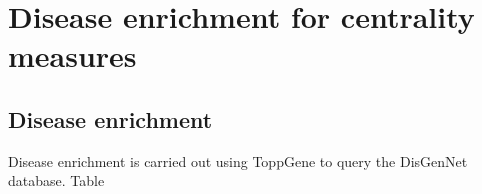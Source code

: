 \section{Disease enrichment for centrality measures}
\label{sec:Disease term enrichment centrality measures}



\subsection{Disease enrichment}
Disease enrichment is carried out using ToppGene to query the DisGenNet database. Table 

\begin{table}[ht]
\centering

\setlength{\extrarowheight}{2pt}
\begin{adjustbox}{width=\textwidth}


\end{adjustbox}
\end{table}
